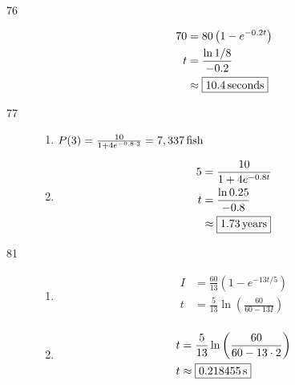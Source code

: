 \documentclass{exam}
\begin{document}
\begin{description}
      \item[76]
        \begin{align*}
          70          &= 80 \left( 1 - e^{-0.2t} \right) \\
          t           &= \frac{\ln 1/8}{-0.2} \\
                      &\approx \boxed{\unit[10.4]{seconds}} \\
        \end{align*}

      \item[77]
        \begin{enumerate}[a]
          \item $P(3) = \frac{10}{1 + 4e^{-0.8 \cdot 3}} = \unit[7,337]{fish}$

          \item 
            \begin{align*}
              5 &= \frac{10}{1 + 4e^{-0.8t}} \\
              t &= \frac{\ln 0.25}{-0.8} \\
                &\approx \boxed{\unit[1.73]{years}} \\
            \end{align*}
        \end{enumerate}

      \item[81]
        \begin{enumerate}[a]
          \item 
            \begin{align*}
              I &= \frac{60}{13} \left( 1 - e^{-13t/5} \right) \\
              t &= \boxed{\frac{5}{13} \ln \left( \frac{60}{60 - 13I} \right) } \\
            \end{align*}

          \item 
            \begin{align*}
              t &= \frac{5}{13} \ln \left( \frac{60}{60 - 13 \cdot 2} \right)  \\
              t &\approx \boxed{\unit[0.218455]{s}} \\
            \end{align*}

        \end{enumerate}

    \end{description}
\end{document}
